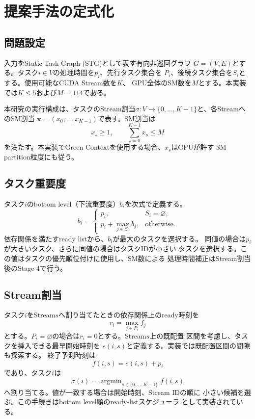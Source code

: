 \section{提案手法の定式化}
\label{sec:method-formulation}

\subsection{問題設定}
入力をStatic Task Graph (STG)として表す有向非巡回グラフ
$G=(V,E)$とする。タスク$i\in V$の処理時間を$p_i$、先行タスク集合を
$P_i$、後続タスク集合を$S_i$とする。使用可能なCUDA Stream数を$K$、
GPU全体のSM数を$M$とする。本実装では$K\leq 5$および$M=114$である。

本研究の実行構成は、タスクのStream割当$\sigma:V\rightarrow
\{0,\ldots,K-1\}$と、各StreamへのSM割当
$\boldsymbol{x}=(x_0,\ldots,x_{K-1})$で表す。SM割当は
\[
  x_s \geq 1,\qquad
  \sum_{s=0}^{K-1}x_s\leq M
\]
を満たす。本実装でGreen Contextを使用する場合、$x_s$はGPUが許す
SM partition粒度にも従う。

\subsection{タスク重要度}
タスク$i$のbottom level（下流重要度）$b_i$を次式で定義する。
\[
 b_i =
 \begin{cases}
 p_i, & S_i=\varnothing,\\
 p_i+\displaystyle\max_{j\in S_i}b_j, & \text{otherwise}.
 \end{cases}
\]
依存関係を満たすready listから、$b_i$が最大のタスクを選択する。
同値の場合は$p_i$が大きいタスク、さらに同値の場合はタスクIDが小さい
タスクを選択する。この値はタスクの優先順位付けに使用し、SM数による
処理時間補正はStream割当後のStage 4で行う。

\subsection{Stream割当}
タスク$i$をStream$s$へ割り当てたときの依存関係上のready時刻を
\[
 r_i=\max_{j\in P_i}f_j
\]
とする。$P_i=\varnothing$の場合は$r_i=0$とする。Stream$s$上の既配置
区間を考慮し、タスクを挿入できる最早開始時刻を
$e(i,s)$と定義する。実装では既配置区間の間隙も探索する。
終了予測時刻は
\[
 f(i,s)=e(i,s)+p_i
\]
であり、タスク$i$は
\[
 \sigma(i)=\mathop{\arg\min}_{s\in\{0,\ldots,K-1\}} f(i,s)
\]
へ割り当てる。値が一致する場合は開始時刻、Stream IDの順に
小さい候補を選ぶ。この手続きはbottom level順のready-listスケジューラ
として実装されている。

